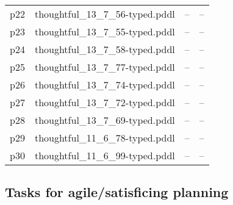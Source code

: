 \documentclass{article}
\begin{document}
\begin{center}
\begin{tabular}{@{}l|r|r|r@{}}
  p22& thoughtful\_13\_7\_56-typed.pddl&--&--\\
  p23& thoughtful\_13\_7\_55-typed.pddl&--&--\\
  p24& thoughtful\_13\_7\_58-typed.pddl&--&--\\
  p25& thoughtful\_13\_7\_77-typed.pddl&--&--\\
  p26& thoughtful\_13\_7\_74-typed.pddl&--&--\\
  p27& thoughtful\_13\_7\_72-typed.pddl&--&--\\
  p28& thoughtful\_13\_7\_69-typed.pddl&--&--\\
  p29& thoughtful\_11\_6\_78-typed.pddl&--&--\\
  p30& thoughtful\_11\_6\_99-typed.pddl&--&--
                            \end{tabular}
                            \end{center}
                    

                    \subsection*{Tasks for agile/satisficing planning}
                    
\end{document}

